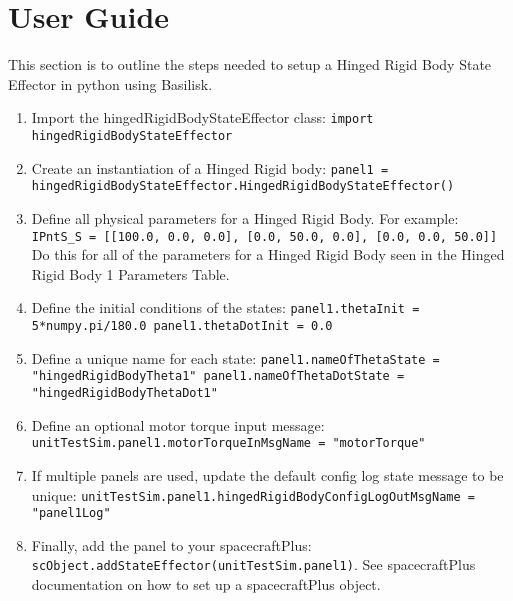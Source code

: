 \section{User Guide}

This section is to outline the steps needed to setup a Hinged Rigid Body State Effector in python using Basilisk.

\begin{enumerate}
	\item Import the hingedRigidBodyStateEffector class: \newline \texttt{import hingedRigidBodyStateEffector}
	\item Create an instantiation of a Hinged Rigid body: \newline \texttt{panel1 = hingedRigidBodyStateEffector.HingedRigidBodyStateEffector()}
	\item Define all physical parameters for a Hinged Rigid Body. For example: \newline
	\texttt{IPntS\_S = [[100.0, 0.0, 0.0], [0.0, 50.0, 0.0], [0.0, 0.0, 50.0]]}\\
	Do this for all of the parameters for a Hinged Rigid Body seen in the Hinged Rigid Body 1 Parameters Table.
	\item Define the initial conditions of the states:\newline
	\texttt{panel1.thetaInit = 5*numpy.pi/180.0 \quad panel1.thetaDotInit = 0.0}
	\item Define a unique name for each state:\newline
	\texttt{panel1.nameOfThetaState = "hingedRigidBodyTheta1" \quad panel1.nameOfThetaDotState = "hingedRigidBodyThetaDot1"}
	
	\item Define an optional motor torque input message: \\
	\texttt{unitTestSim.panel1.motorTorqueInMsgName = "motorTorque"}
	
	\item If multiple panels are used, update the default config log state message to be unique:
	\texttt{unitTestSim.panel1.hingedRigidBodyConfigLogOutMsgName = "panel1Log"}
	
	\item Finally, add the panel to your spacecraftPlus:\newline
	\texttt{scObject.addStateEffector(unitTestSim.panel1)}. See spacecraftPlus documentation on how to set up a spacecraftPlus object. 
\end{enumerate}
